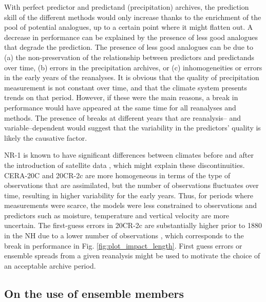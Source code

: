 \documentclass[smallextended]{svjour3}       %
\begin{document}
	With perfect predictor and predictand (precipitation) archives, the prediction skill of the different methods would only increase thanks to the enrichment of the pool of potential analogues, up to a certain point where it might flatten out. A decrease in performance can be explained by the presence of less good analogues that degrade the prediction. The presence of less good analogues can be due to (a) the non-preservation of the relationship between predictors and predictands over time, (b) errors in the precipitation archives, or (c) inhomogeneities or errors in the early years of the reanalyses. It is obvious that the quality of precipitation measurement is not constant over time, and that the climate system presents trends on that period. However, if these were the main reasons, a break in performance would have appeared at the same time for all reanalyses and methods. The presence of breaks at different years that are reanalysis-- and variable--dependent would suggest that the variability in the predictors' quality is likely the causative factor.
	
	NR-1 is known to have significant differences between climates before and after the introduction of satellite data \citep{Kistler2001}, which might explain these discontinuities. CERA-20C and 20CR-2c are more homogeneous in terms of the type of observations that are assimilated, but the number of observations fluctuates over time, resulting in higher variability for the early years. Thus, for periods where measurements were scarce, the models were less constrained to observations and predictors such as moisture, temperature and vertical velocity are more uncertain. The first-guess errors in 20CR-2c are substantially higher prior to 1880 in the NH due to a lower number of observations \citep{Compo2011}, which corresponds to the break in performance in Fig. \ref{fig:plot_impact_length}. First guess errors or ensemble spreads from a given reanalysis might be used to motivate the choice of an acceptable archive period.
	
	
	\subsection{On the use of ensemble members}
	\label{sec:ensemble}
	
\end{document}
